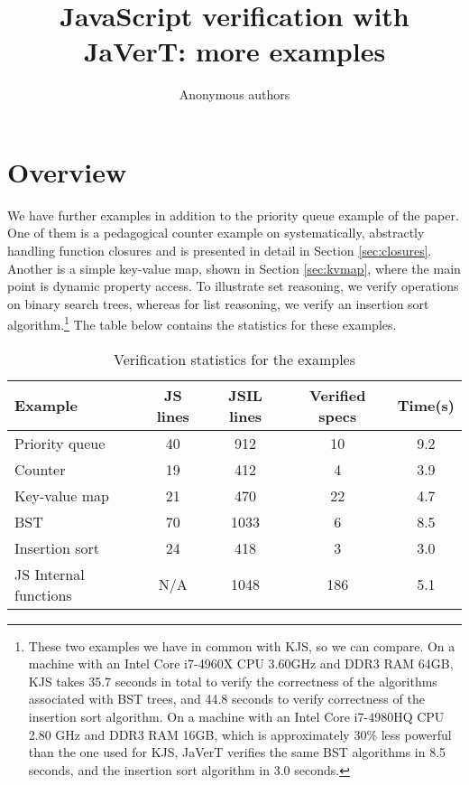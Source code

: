 \documentclass{article}
\newcounter{main}
\begin{document}
\title{JavaScript verification with JaVerT: more examples}
\author{Anonymous authors}

\maketitle


\section{Overview}

We have further examples in addition to the priority queue example of the paper. One of them is a pedagogical counter example on systematically, abstractly handling function closures and is presented in detail in Section \ref{sec:closures}. Another is a simple key-value map, shown in Section \ref{sec:kvmap}, where the main point is dynamic property access. To illustrate set reasoning, we verify operations on binary search trees, whereas for list reasoning, we verify an insertion sort algorithm.\footnote{These two examples we have in common with KJS, so we can compare. On a machine with an Intel Core i7-4960X CPU 3.60GHz and DDR3 RAM 64GB, KJS takes 35.7 seconds in total to verify the correctness of the algorithms associated with BST trees, and 44.8 seconds to verify correctness of the insertion sort algorithm. On a machine with an Intel Core i7-4980HQ CPU 2.80 GHz and DDR3 RAM 16GB, which is approximately 30\% less powerful than the one used for KJS, JaVerT verifies the same BST algorithms in 8.5 seconds, and the insertion sort algorithm in 3.0 seconds.} The table below contains the statistics for these examples.

\begin{table}[!h]
	\centering
    \begin{tabular}{|lcccc|}
    \hline
      \rowcolor{SkyBlue!40}
      {\bfseries Example} & {\bfseries JS lines} & {\bfseries JSIL lines} & {\bfseries Verified specs} & {\bfseries Time(s)} \\
      \hline
      Priority queue		&  40 &  912 &  10 & 9.2 \\
      Counter				&  19 &  412 &   4 & 3.9 \\ 
      Key-value map			&  21 &  470 &  22 & 4.7 \\
      BST					&  70 & 1033 &   6 & 8.5 \\
      Insertion sort		&  24 &  418 &   3 & 3.0 \\
      JS Internal functions & N/A & 1048 & 186 & 5.1 \\
      \hline
   \end{tabular}
  \caption{Verification statistics for the examples}
  \label{tab:stats}
\end{table}
\end{document}
